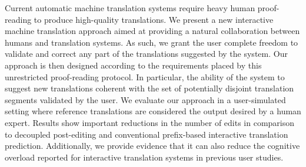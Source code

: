 Current automatic machine translation systems require heavy human proof-reading to produce high-quality translations. We present a new interactive machine translation approach aimed at providing a natural collaboration between humans and translation systems. As such, we grant the user complete freedom to validate and correct any part of the translations suggested by the system. Our approach is then designed according to the requirements placed by this unrestricted proof-reading protocol. In particular, the ability of the system to suggest new translations coherent with the set of potentially disjoint translation segments validated by the user. We evaluate our approach in a user-simulated setting where reference translations are considered the output desired by a human expert. Results show important reductions in the number of edits in comparison to decoupled post-editing and conventional prefix-based interactive translation prediction. Additionally, we provide evidence that it can also reduce the cognitive overload reported for interactive translation systems in previous user studies.
